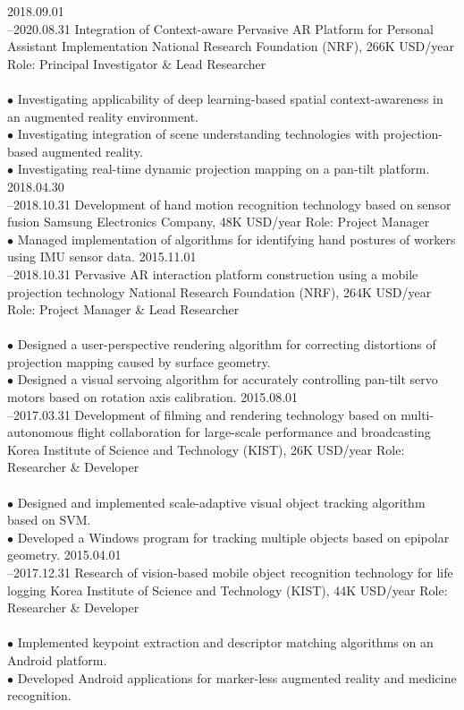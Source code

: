 \documentclass[]{friggeri-cv}
\begin{document}
\begin{entrylist}
  \entry
    {2018.09.01\\--2020.08.31} %
    {Integration of Context-aware Pervasive AR Platform for Personal Assistant Implementation}
    {National Research Foundation (NRF), 266K USD/year}
    {Role: Principal Investigator \& Lead Researcher\\
    \\
    $\bullet$ Investigating applicability of deep learning-based spatial context-awareness in an augmented reality environment.\\
    $\bullet$ Investigating integration of  scene understanding technologies with projection-based augmented reality.\\
    $\bullet$ Investigating real-time dynamic projection mapping on a pan-tilt platform.
    }
  \entry
    {2018.04.30\\--2018.10.31}
    {Development of hand motion recognition technology based on sensor fusion}
    {Samsung Electronics Company, 48K USD/year}
    {Role: Project Manager\\
    
    $\bullet$ Managed implementation of algorithms for identifying hand postures of workers using IMU sensor data.
    }
  \entry
    {2015.11.01\\--2018.10.31} 
    {Pervasive AR interaction platform construction using a mobile projection technology}
    {National Research Foundation (NRF), 264K USD/year}
    {Role: Project Manager \& Lead Researcher\\
    \\
    $\bullet$ Designed a user-perspective rendering algorithm for correcting distortions of projection mapping caused by surface geometry.\\
    $\bullet$ Designed  a visual servoing algorithm for accurately controlling pan-tilt servo motors based on rotation axis calibration.
    }
  \entry
    {2015.08.01\\--2017.03.31}
    {Development of filming and rendering technology based on multi-autonomous flight collaboration for large-scale performance and broadcasting}
    {Korea Institute of Science and Technology (KIST), 26K USD/year}
    {Role: Researcher \& Developer\\
    \\
    $\bullet$ Designed and implemented scale-adaptive visual object tracking algorithm based on SVM.\\
    $\bullet$ Developed a Windows program for tracking multiple objects based on epipolar geometry.
    }
  \entry
    {2015.04.01\\--2017.12.31}
    {Research of vision-based mobile object recognition technology for life logging}
    {Korea Institute of Science and Technology (KIST), 44K USD/year}
    {Role: Researcher \& Developer\\
    \\
    $\bullet$ Implemented keypoint extraction and descriptor matching algorithms on an Android platform.\\
    $\bullet$ Developed Android applications for marker-less augmented reality and medicine recognition.
    }
\end{entrylist}
\end{document}
